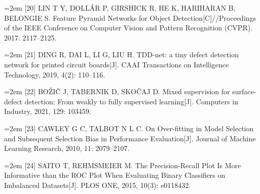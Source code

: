 {\small\noindent\hangindent=2em \hypertarget{ref:20}{}[20] LIN T Y, DOLLÁR P, GIRSHICK R, HE K, HARIHARAN B, BELONGIE S. Feature Pyramid Networks for Object Detection[C]//Proceedings of the IEEE Conference on Computer Vision and Pattern Recognition (CVPR). 2017: 2117–2125.\par}

{\small\noindent\hangindent=2em \hypertarget{ref:21}{}[21] DING R, DAI L, LI G, LIU H. TDD-net: a tiny defect detection network for printed circuit boards[J]. CAAI Transactions on Intelligence Technology, 2019, 4(2): 110–116.\par}

{\small\noindent\hangindent=2em \hypertarget{ref:22}{}[22] BOŽIČ J, TABERNIK D, SKOČAJ D. Mixed supervision for surface-defect detection: From weakly to fully supervised learning[J]. Computers in Industry, 2021, 129: 103459.\par}

{\small\noindent\hangindent=2em \hypertarget{ref:23}{}[23] CAWLEY G C, TALBOT N L C. On Over-fitting in Model Selection and Subsequent Selection Bias in Performance Evaluation[J]. Journal of Machine Learning Research, 2010, 11: 2079–2107.\par}

{\small\noindent\hangindent=2em \hypertarget{ref:24}{}[24] SAITO T, REHMSMEIER M. The Precision-Recall Plot Is More Informative than the ROC Plot When Evaluating Binary Classifiers on Imbalanced Datasets[J]. PLOS ONE, 2015, 10(3): e0118432.\par}
\endgroup
